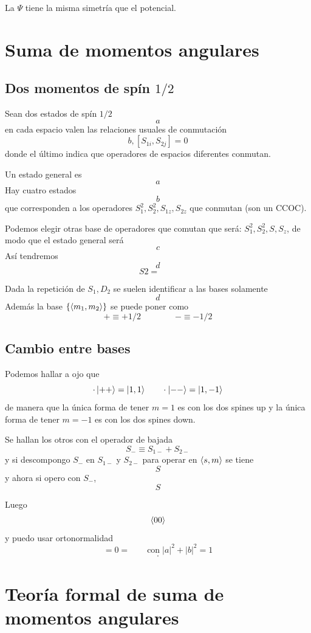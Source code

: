\documentclass[10pt,oneside]{CBFT_book}
\begin{document}
La $\Psi$ tiene la misma simetría que el potencial.

\section{Suma de momentos angulares}

\subsection{Dos momentos de spín $1/2$}

Sean dos estados de spín $1/2$
\[
	a
\]
en cada espacio valen las relaciones usuales de conmutación 
\[
	b, [S_{1i},S_{2j}] = 0
\]
donde el último indica que operadores de espacios diferentes conmutan.

Un estado general es 
\[
	a
\]
Hay cuatro estados
\[
	b
\]
que corresponden a los operadores $S_ 1^2, S_2^2, S_{1z}, S_{2z}$ que conmutan (son un CCOC).

Podemos elegir otras base de operadores que comutan que será: $S_ 1^2, S_2^2, S, S_{z}$, de modo que el estado general 
será
\[
	c
\]
Así tendremos
\[
	d
\]
\[
	S 2 =  \qquad 
\]

Dada la repetición de $S_1,D_2$ se suelen identificar a las bases solamente 
\[
	d
\]
Además la base $\{ \Braket{m_1,m_2}\}$ se puede poner como 
\[
	+ \equiv + 1/2 \qquad\qquad - \equiv - 1/2
\]

\subsection{Cambio entre bases}

Podemos hallar a ojo que 
\[
	\cdot \Ket{++} = \Ket{1,1} \qquad \cdot \Ket{--} = \Ket{1,-1} 
\]
de manera que la única forma de tener $m=1$ es con los dos spines up y la única forma de tener $m=-1$ es con los dos 
spines down.

Se hallan los otros con el operador de bajada
\[
	S_- \equiv S_{1-} + S_{2-}
\]
y si descompongo $S_-$ en $S_{1-}$ y $S_{2-}$ para operar en $\Braket{s,m}$ se tiene 
\[
	S
\]
y ahora si opero con $S_-$,
\[
	S
\]

Luego
\[
	\Braket{00}
\]
y puedo usar ortonormalidad 
\[
	= 0 = \qquad \text{con} \; |a|^2 + |b|^2 = 1
\]
\[
	\cdot 
\]


\section{Teoría formal de suma de momentos angulares}
\end{document}
